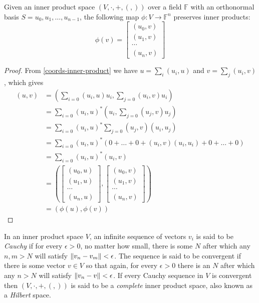 \begin{prop}\label{vectors-tuples}
	Given an inner product space $(V, \cdot, +, (,))$ over a field $\mathbb{F}$ with an orthonormal basis $S = {u_0, u_1, \dots, u_{n-1}}$, the following map $\phi:V \to \mathbb{F}^n$ preserves inner products:
	\[\phi(v) = \left[\begin{matrix}
		(u_0, v)\\
		(u_1, v)\\
		\cdots\\
		(u_n, v)
	\end{matrix}\right]\]
\end{prop}
\begin{proof}
	From \autoref{coords-inner-product} we have $u = \sum_i (u_i, u)$ and $v = \sum_j (u_i, v)$, which gives
	\begin{align*}
		(u, v)
		&= \left(\sum_{i=0}(u_i, u)u_i, \sum_{j=0} (u_i,v)u_i\right)
		\\&= \sum_{i=0}(u_i, u)^*\left(u_i, \sum_{j=0} (u_j, v)u_j\right)
		\\&= \sum_{i=0}(u_i, u)^*\sum_{j=0} (u_j, v)\left(u_i, u_j\right)
		\\&= \sum_{i=0}(u_i, u)^*\left(0 + \dots + 0 + (u_i, v)\left(u_i, u_i\right) + 0 + \dots + 0\right)
		\\&= \sum_{i=0}(u_i, u)^*(u_i, v)
		\\&= \left(
		\left[\begin{matrix}
			(u_0, u)\\
			(u_1, u)\\
			\cdots\\
			(u_n, u)
		\end{matrix}\right]
		,
		\left[\begin{matrix}
			(u_0, v)\\
			(u_1, v)\\
			\cdots\\
			(u_n, v)
		\end{matrix}\right]
		\right)
		\\&= (\phi(u), \phi(v))
	\end{align*}
\end{proof}

\begin{define}
	In an inner product space $V$, an infinite sequence of vectors $v_i$ is said to be \emph{Cauchy} if for every $\epsilon > 0$, no matter how small, there is some $N$ after which any $n, m > N$ will satisfy $\left\Vert v_n - v_m \right\Vert < \epsilon$. The sequence is said to be convergent if there is some vector $v \in V$ so that again, for every $\epsilon > 0$ there is an $N$ after which any $n > N$ will satisfy $\left\Vert v_n - v \right\Vert < \epsilon$. If every Cauchy sequence in $V$ is convergent then $(V, \cdot, +, (,))$ is said to be a \emph{complete} inner product space, also known as a \emph{Hilbert} space.
\end{define}

